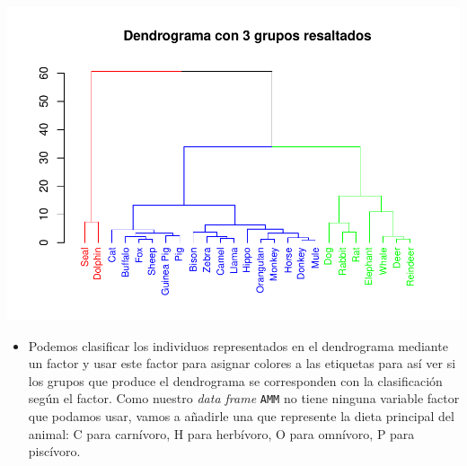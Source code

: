 \documentclass[
]{book}
\providecommand{\tightlist}{%
  \setlength{\itemsep}{0pt}\setlength{\parskip}{0pt}}
\theoremstyle{definition}
\theoremstyle{definition}
\theoremstyle{definition}
\theoremstyle{remark}
\begin{document}
\begin{center}\includegraphics[width=0.9\linewidth]{14cap13_EDextra_files/figure-latex/unnamed-chunk-27-1} \end{center}

\begin{itemize}
\tightlist
\item
  Podemos clasificar los individuos representados en el dendrograma mediante un factor
  y usar este factor para asignar colores a las etiquetas para así ver si los grupos que produce el dendrograma se corresponden con la clasificación según el factor. Como nuestro \emph{data frame} \texttt{AMM} no tiene ninguna variable factor que podamos usar, vamos a añadirle una que represente la dieta principal del animal: C para carnívoro, H para herbívoro, O para omnívoro, P para piscívoro.
\end{itemize}
\end{document}
